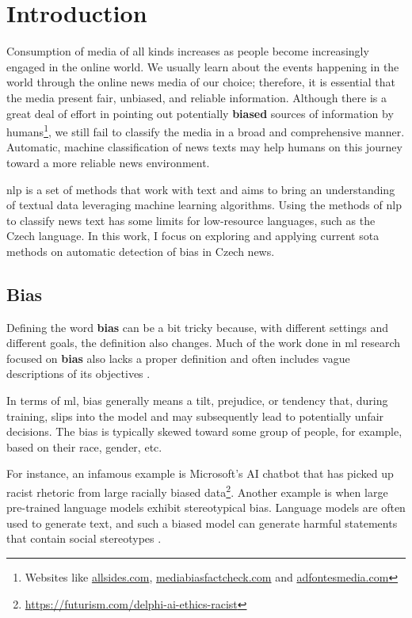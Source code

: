 \chapter{Introduction}
Consumption of media of all kinds increases as people become increasingly engaged in the online world. We usually learn about the events happening in the world through the online news media of our choice; therefore, it is essential that the media present fair, unbiased, and reliable information. Although there is a great deal of effort in pointing out potentially \textbf{biased} sources of information by humans\footnote{Websites like \url{allsides.com}, \url{mediabiasfactcheck.com} and \url{adfontesmedia.com}}, we still fail to classify the media in a broad and comprehensive manner. Automatic, machine classification of news texts may help humans on this journey toward a more reliable news environment.

\gls{nlp} is a set of methods that work with text and aims to bring an understanding of textual data leveraging machine learning algorithms. Using the methods of \gls{nlp} to classify news text has some limits for low-resource languages, such as the Czech language. In this work, I focus on exploring and applying current \gls{sota} methods on automatic detection of bias in Czech news.


\section{Bias}
Defining the word \textbf{bias} can be a bit tricky because, with different settings and different goals, the definition also changes. Much of the work done in \gls{ml} research focused on \textbf{bias} also lacks a proper definition and often includes vague descriptions of its objectives \cite{blodgett2020language}. 

In terms of \Gls{ml}, bias generally means a tilt, prejudice, or tendency that, during training, slips into the model and may subsequently lead to potentially unfair decisions. The bias is typically skewed toward some group of people, for example, based on their race, gender, etc. 

For instance, an infamous example is Microsoft's AI chatbot that has picked up racist rhetoric from large racially biased data\footnote{\url{https://futurism.com/delphi-ai-ethics-racist}}. Another example is when large pre-trained language models exhibit stereotypical bias. Language models are often used to generate text, and such a biased model can generate harmful statements that contain social stereotypes \cite{nadeem2021stereoset}.

